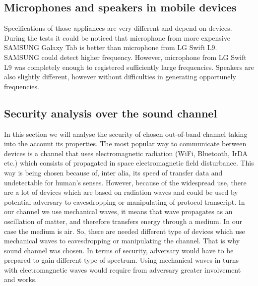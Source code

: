 \documentclass[11pt,titlepage]{article}
\theoremstyle{plain}
\begin{document}

\subsection{Microphones and speakers in mobile devices}
Specifications of those appliances are very different and depend on devices. During the tests it could be noticed that microphone from more expensive SAMSUNG Galaxy Tab is better than microphone from LG Swift L9. SAMSUNG could detect higher frequency. However, microphone from LG Swift L9 was completely enough to registered sufficiently large frequencies. Speakers are also slightly  different, however without difficulties in  generating opportunely frequencies.

\subsection{Security analysis over the sound channel}
In this section we will analyse the security of chosen out-of-band channel taking into the account its properties. The most popular way to communicate between devices is a channel that uses electromagnetic radiation (WiFi, Bluetooth, IrDA etc.) which consists of propagated in space electromagnetic field disturbance. This way is being chosen because of, inter alia, its speed of transfer data and undetectable for human's senses. However, because of the widespread use, there are a lot of devices which are based on radiation waves and could be used by potential adversary to eavesdropping or manipulating of protocol transcript. In our channel we use mechanical waves, it means that wave propagates as an oscillation of matter, and therefore transfers energy through a medium. In our case the medium is air. So, there are needed different type of devices which use mechanical waves to eavesdropping or manipulating the channel. That is why sound channel was chosen. In terms of security, adversary would have to be prepared to gain different type of spectrum. Using mechanical waves in turns with electromagnetic waves would require from adversary greater involvement and works.
\end{document}
